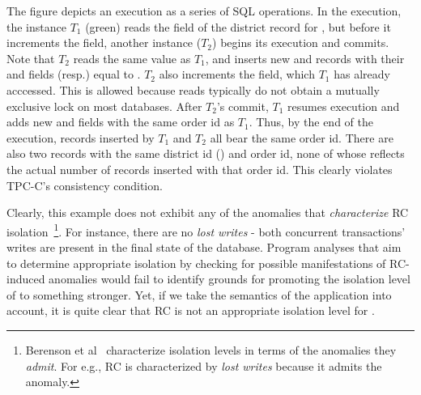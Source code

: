 
The figure depicts an execution as a series of SQL operations. In the
execution, the  instance $T_1$ (green) reads the
 field of the district record for , but
before it increments the field, another  instance
($T_2$) begins its execution and commits. Note that $T_2$ reads the
same  value as $T_1$, and inserts new  and
 records with their  and  fields
(resp.) equal to . $T_2$ also increments the
 field, which $T_1$ has already acccessed. This is
allowed because reads typically do not obtain a mutually exclusive
lock on most databases. After $T_2$'s commit, $T_1$ resumes execution
and adds new  and  fields with the same order
id as $T_1$. Thus, by the end of the execution, 
records inserted by $T_1$ and $T_2$ all bear the same order id. There
are also two  records with the same district id ()
and order id, none of whose  reflects the actual number
of  records inserted with that order id.  This clearly
violates TPC-C's consistency condition.

Clearly, this example does not exhibit any of the anomalies that
\emph{characterize} RC isolation~\cite{berenson}\footnote{Berenson et
al~\cite{berenson} characterize isolation levels in terms of the
anomalies they \emph{admit}. For e.g., RC is characterized by
\emph{lost writes} because it admits the anomaly.}. For instance,
there are no \emph{lost writes} - both concurrent transactions' writes
are present in the final state of the database.  Program analyses that
aim to determine appropriate isolation by checking for possible
manifestations of RC-induced anomalies would fail to identify grounds
for promoting the isolation level of  to something
stronger.  Yet, if we take the semantics of the application into
account, it is quite clear that RC is not an appropriate isolation
level for .

